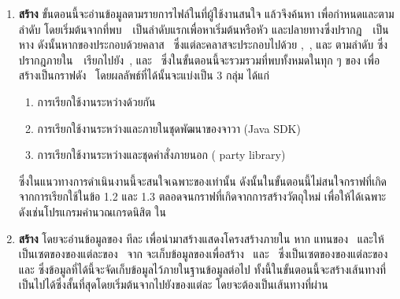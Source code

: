 \begin{enumerate}
    \item {\bf สร้าง{\scg}} ขั้นตอนนี้จะอ่านข้อมูล{\CUT}ตามรายการไฟล์ใน{\Package}ที่ผู้ใช้งานสนใจ 
        แล้วจึงค้นหา{\callingStatement} เพื่อกำหนด{\callingMethod}และ{\calledMethod}ตามลำดับ 
        โดยเริ่มต้นจาก{\class}ที่พบ{\method}~~เป็นลำดับแรกเพื่อหา{\Node}เริ่มต้นหรือ{\Node}หัว
        และ{\class}ปลายทางซึ่งปรากฎ~\calledMethod~เป็น{\Node}หาง 
        ดังนั้นหาก{\sourcecode}ของ{\SUT}ประกอบด้วยคลาส~ ซึ่งแต่ละคลาสจะประกอบไปด้วย{\method}
        ,~, และ  ตามลำดับ
        ซึ่งปรากฎ{\callingStatement}ภายใน{\method}~~เรียกไปยัง{\method}~,
        และ~ ซึ่งในขั้นตอนนี้จะรวมรวม{\callingStatement}ที่พบทั้งหมดในทุก ๆ {\class}ของ{\SUT}
        เพื่อสร้างเป็นกราฟดัง~ โดยผลลัพธ์ที่ได้นั้นจะแบ่งเป็น 3 กลุ่ม ได้แก่
        \begin{enumerate}
            \item การเรียกใช้งานระหว่าง{\CUT}ด้วยกัน \label{ord:scgcut} 
            \item การเรียกใช้งานระหว่าง{\CUT}และ{\class}ภายในชุดพัฒนาของจาวา (Java SDK) \label{ord:scgjdk} 
            \item การเรียกใช้งานระหว่าง{\CUT}และชุดคำสั่งภายนอก ( party library) \label{ord:scg3rd} 
        \end{enumerate}
        \-\hspace{1cm}ซึ่งในแนวทางการดำเนินงานนี้จะสนใจเฉพาะ{\scg}ของ{\CUT}เท่านั้น 
        ดังนั้นในขั้นตอนนี้ไม่สนใจกราฟที่เกิดจากการเรียกใช้ในข้อ 1.2 
        และ 1.3 ตลอดจนกราฟที่เกิดจากการสร้างวัตถุใหม่ เพื่อให้ได้{\scg}เฉพาะ{\CUT} ดังเช่น{\scg}โปรแกรมคํานวณเกรดนิสิต 
        ใน

    \item {\bf สร้าง{\cfg}} โดยจะอ่านข้อมูลของ{\CUT} ทีละ{\method} เพื่อนำมาสร้าง{\cfg}แสดงโครงสร้างภายใน{\method}
        หาก  แทน{\cfg}ของ{\method}~ และให้  
        เป็นเซตของ{\cfg}ของแต่ละ{\method}ของ{\class}~ จาก 
        จะเก็บข้อมูลของ{\CUT}เพื่อสร้าง ~และ~ ซึ่งเป็นเซตของ{\cfg}ของแต่ละ{\method}ของ{\class}
         และ  ซึ่งข้อมูลที่ได้นี้จะจัดเก็บข้อมูลไว้ภายในฐานข้อมูลต่อไป
        ทั้งนี้ในขั้นตอนนี้จะสร้างเส้นทางที่เป็นไปได้ซึ่งสั้นที่สุดโดยเริ่มต้นจาก{\sourcenode}ไปยัง{\sinknode}ของแต่ละ{\method} 
        โดยจะต้องเป็นเส้นทางที่ผ่าน{\callingStatement}
\end{enumerate}

